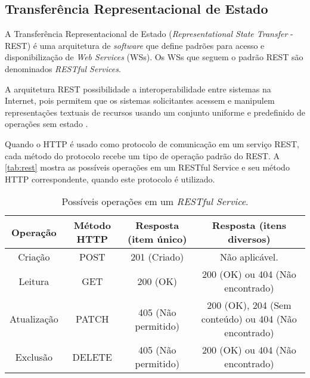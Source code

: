 	\subsection{Transferência Representacional de Estado}
	
	A Transferência Representacional de Estado (\textit{Representational State Transfer} - REST) é uma arquitetura de \textit{software} que define padrões para acesso e disponibilização de \textit{Web Services} (WSs). Os WSs que seguem o padrão REST são denominados \textit{RESTful Services}.
	
	A arquitetura REST possibilidade a interoperabilidade entre sistemas na Internet, pois permitem que os sistemas solicitantes acessem e manipulem representações textuais de recursos usando um conjunto uniforme e predefinido de operações sem estado \cite{ferris2004webservices}.
	
	Quando o HTTP é usado como protocolo de comunicação em um serviço REST, cada método do protocolo recebe um tipo de operação padrão do REST. A \autoref{tab:rest} mostra as possíveis operações em um RESTful Service e seu método HTTP correspondente, quando este protocolo é utilizado.
	

	\begin{table}[htb]
		\centering
		\footnotesize
		\caption{Possíveis operações em um \textit{RESTful Service}.}
		\label{tab:rest}
		\begin{tabulary}{\textwidth}{ |C|C|C|C| }
			\hline
			\textbf{Operação} &
			\textbf{Método HTTP} &
			\textbf{Resposta (item único)} &
			\textbf{Resposta (itens diversos)} \\

			\hline
			Criação &
			POST &
			201 (Criado) &
			Não aplicável. \\
			
			\hline
			Leitura &
			GET &
			200 (OK) &
			200 (OK) ou 404 (Não encontrado) \\
			
			\hline
			Atualização &
			PATCH &
			405 (Não permitido) &
			200 (OK), 204 (Sem conteúdo) ou 404 (Não encontrado) \\
			
			\hline
			Exclusão &
			DELETE &
			405 (Não permitido) &
			200 (OK) ou 404 (Não encontrado) \\[5mm]
			
			\hline
		\end{tabulary}
	\end{table}
